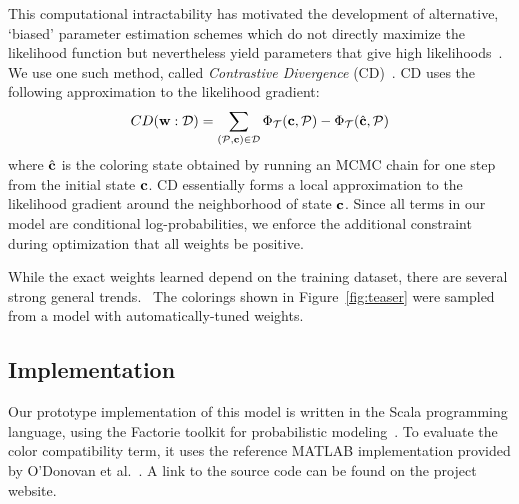 This computational intractability has motivated the development of alternative, `biased' parameter estimation schemes which do not directly maximize the likelihood function but nevertheless yield parameters that give high likelihoods~\cite{NonMLEParameterEstimation}. We use one such method, called \emph{Contrastive Divergence} (CD)~\cite{ContrastiveDivergence}. CD uses the following approximation to the likelihood gradient:
\begin{equation*}
CD(\mathbf{w} : \mathcal{D}) = 
	\sum_{(\mathcal{P}, \mathbf{c}) \in \mathcal{D}}
			\Phi_{\mathcal{T}}(\mathbf{c}, \mathcal{P})
		 -\Phi_{\mathcal{T}}(\hat{\mathbf{c}}, \mathcal{P})
\end{equation*}
where $\hat{\mathbf{c}}$ is the coloring state obtained by running an MCMC chain for one step from the initial state $\mathbf{c}$. CD essentially forms a local approximation to the likelihood gradient around the neighborhood of state $\mathbf{c}$. Since all terms in our model are conditional log-probabilities, we enforce the additional constraint during optimization that all weights be positive.~

While the exact weights learned depend on the training dataset, there are several strong general trends.~ The colorings shown in Figure~\ref{fig:teaser} were sampled from a model with automatically-tuned weights.

\subsection{Implementation}
\label{sec:implementation}

Our prototype implementation of this model is written in the Scala programming language, using the Factorie toolkit for probabilistic modeling~\cite{Factorie}. To evaluate the color compatibility term, it uses the reference MATLAB implementation provided by O'Donovan et al.~. A link to the source code can be found on the project website.